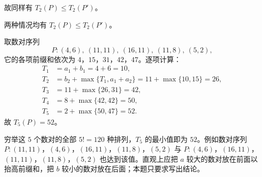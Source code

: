 \begin{answer}
故同样有 $T_2(P)\leqslant T_2(P')$。

两种情况均有 $T_2(P)\leqslant T_2(P')$。


取数对序列
\nopagebreak[4]
\[P:(4,6),\ (11,11),\ (16,11),\ (11,8),\ (5,2),\]
它的各项前缀和依次为 $4$，$15$，$31$，$42$，$47$。逐项计算：
\nopagebreak[4]
\[\begin{aligned}
T_1&=a_1+b_1=4+6=10,\\
T_2&=b_2+\max\{T_1,a_1+a_2\}=11+\max\{10,15\}=26,\\
T_3&=11+\max\{26,31\}=42,\\
T_4&=8+\max\{42,42\}=50,\\
T_5&=2+\max\{50,47\}=52 .
\end{aligned}\]
故 $T_5(P)=52$。

穷举这 $5$ 个数对的全部 $5!=120$ 种排列，$T_5$ 的最小值即为 $52$。例如数对序列 $P:(11,11)$，$(4,6)$，$(16,11)$，$(11,8)$，$(5,2)$ 与 $P:(4,6)$，$(16,11)$，$(11,11)$，$(11,8)$，$(5,2)$ 也达到该值。直观上应把 $a$ 较大的数对放在前面以抬高前缀和，把 $b$ 较小的数对放在后面；本题只要求写出结论。




\end{answer}